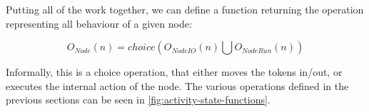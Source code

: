 \begin{definition}
	Putting all of the work together, we can define a function returning the operation representing all behaviour of a given node:
	
	\begin{equation*}
		O_\mathit{Node}(n) = \mathit{choice}(O_\mathit{NodeIO}(n) \bigcup O_\mathit{NodeRun}(n))
	\end{equation*}
\end{definition}

Informally, this is a choice operation, that either moves the tokens in/out, or executes the internal action of the node. The various operations defined in the previous sections can be seen in \autoref{fig:activity-state-functions}. 

\iffalse

